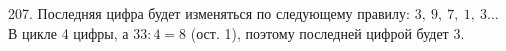 207. Последняя цифра будет изменяться по следующему правилу: $3,\ 9,\ 7,\ 1,\ 3\ldots$ В цикле 4 цифры, а $33:4=8$ (ост. 1), поэтому последней цифрой будет 3.\\
